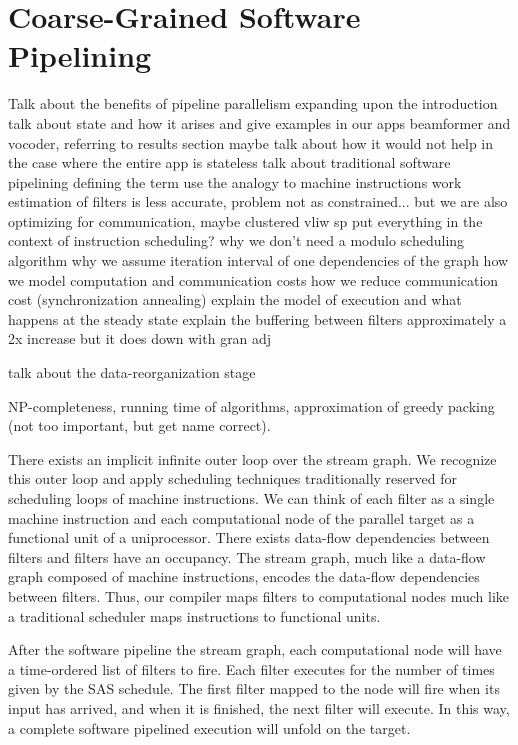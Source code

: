 \section{Coarse-Grained Software Pipelining} 

Talk about the benefits of pipeline parallelism
  expanding upon the introduction
  talk about state and how it arises and give examples in our apps
     beamformer and vocoder, referring to results section
  maybe talk about how it would not help in the case where the entire
     app is stateless
  talk about traditional software pipelining defining the term
  use the analogy to machine instructions
     work estimation of filters is less accurate, problem not as 
             constrained...
     but we are also optimizing for communication, maybe clustered
             vliw sp
  put everything in the context of instruction scheduling?
  why we don't need a modulo scheduling algorithm
  why we assume iteration interval of one
  dependencies of the graph
  how we model computation and communication costs
  how we reduce communication cost (synchronization annealing)
  explain the model of execution and what happens at the steady state
  explain the buffering between filters
	approximately a 2x increase but it does down with gran adj
  
talk about the data-reorganization stage

NP-completeness, running time of algorithms, approximation of greedy
packing (not too important, but get name correct).


There exists an implicit infinite outer loop over the stream graph. We
recognize this outer loop and apply scheduling techniques
traditionally reserved for scheduling loops of machine
instructions. We can think of each filter as a single machine
instruction and each computational node of the parallel target as a
functional unit of a uniprocessor. There exists data-flow dependencies
between filters and filters have an occupancy.  The stream graph, much
like a data-flow graph composed of machine instructions, encodes the
data-flow dependencies between filters. Thus, our compiler maps
filters to computational nodes much like a traditional scheduler maps
instructions to functional units.

After the software pipeline the stream graph, each computational node
will have a time-ordered list of filters to fire. Each filter executes
for the number of times given by the SAS schedule.  The first filter
mapped to the node will fire when its input has arrived, and when it
is finished, the next filter will execute.  In this way, a complete
software pipelined execution will unfold on the target.

